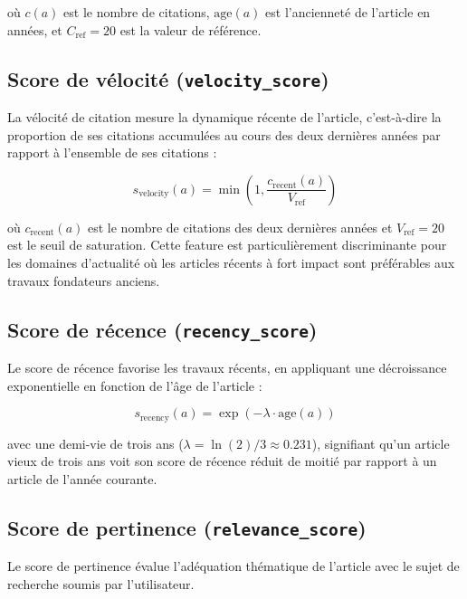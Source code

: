 où $c(a)$ est le nombre de citations, $\text{age}(a)$ est l'ancienneté
de l'article en années, et $C_{\text{ref}} = 20$ est la valeur de référence.

\subsection{Score de vélocité (\texttt{velocity\_score})}

La vélocité de citation mesure la dynamique récente de l'article, c'est-à-dire
la proportion de ses citations accumulées au cours des deux dernières années
par rapport à l'ensemble de ses citations :

\begin{equation}
  s_{\text{velocity}}(a) = \min\left(1, \frac{c_{\text{recent}}(a)}{V_{\text{ref}}}\right)
  \label{eq:velocity_score}
\end{equation}

où $c_{\text{recent}}(a)$ est le nombre de citations des deux dernières années
et $V_{\text{ref}} = 20$ est le seuil de saturation. Cette feature est
particulièrement discriminante pour les domaines d'actualité où les articles
récents à fort impact sont préférables aux travaux fondateurs anciens.

\subsection{Score de récence (\texttt{recency\_score})}

Le score de récence favorise les travaux récents, en appliquant une décroissance
exponentielle en fonction de l'âge de l'article :

\begin{equation}
  s_{\text{recency}}(a) = \exp\left(-\lambda \cdot \text{age}(a)\right)
  \label{eq:recency_score}
\end{equation}

avec une demi-vie de trois ans ($\lambda = \ln(2)/3 \approx 0.231$),
signifiant qu'un article vieux de trois ans voit son score de récence
réduit de moitié par rapport à un article de l'année courante.

\subsection{Score de pertinence (\texttt{relevance\_score})}

Le score de pertinence évalue l'adéquation thématique de l'article
avec le sujet de recherche soumis par l'utilisateur.

